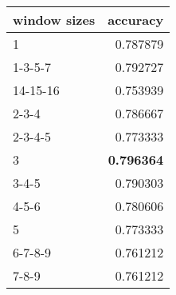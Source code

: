 \begin{tabular}{lr}
\toprule
window sizes &  accuracy \\
\midrule
1        &  0.787879 \\
1-3-5-7  &  0.792727 \\
14-15-16 &  0.753939 \\
2-3-4    &  0.786667 \\
2-3-4-5  &  0.773333 \\
3        &  \textbf{0.796364} \\
3-4-5    &  0.790303 \\
4-5-6    &  0.780606 \\
5        &  0.773333 \\
6-7-8-9  &  0.761212 \\
7-8-9    &  0.761212 \\
\bottomrule
\end{tabular}
